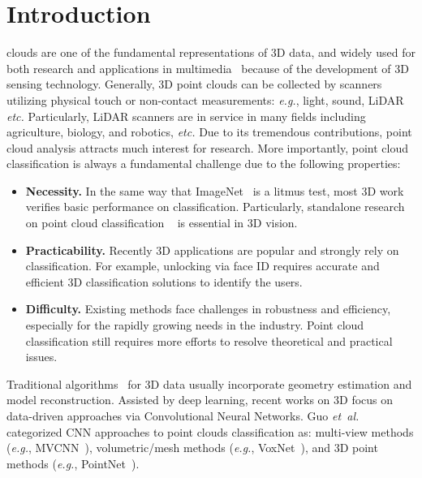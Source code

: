 \documentclass[journal,twoside]{IEEEtran}
\newcommand{\latinphrase}[1]{\textit{#1}}
\newcommand{\etal}{\latinphrase{et~al.}\xspace}
\newcommand{\eg}{\latinphrase{e.g.}\xspace}
\newcommand{\etc}{\latinphrase{etc.}\xspace}
\begin{document}
\section{Introduction}
\label{sec:intro}
 clouds are one of the fundamental representations of 3D data, and widely used for both research and applications in multimedia~\cite{chen2013point, wu2016fast, de2018graph, valsesia2020learning, zhang2020pointhop} because of the development of 3D sensing technology. Generally, 3D point clouds can be collected by scanners~\cite{blais2004review} utilizing physical touch or non-contact measurements: \eg, light, sound, LiDAR \etc Particularly, LiDAR scanners \cite{jaboyedoff2012use} are in service in many fields including agriculture, biology, and robotics, \etc Due to its tremendous contributions, point cloud analysis attracts much interest for research. More importantly, point cloud classification is always a fundamental challenge due to the following properties:
\begin{itemize}
\item \textbf{Necessity.}   In the same way that ImageNet~\cite{deng2009imagenet} is a litmus test, most 3D work verifies basic performance on classification. Particularly, standalone research on point cloud classification ~\cite{yang2018foldingnet,roveri2018network,chen2018sampled,Uy_2019_ICCV, Li_2020_CVPR, Nezhadarya_2020_CVPR} is essential in 3D vision.
\item  \textbf{Practicability.}  Recently 3D applications are popular and strongly rely on classification. For example, unlocking via face ID requires accurate and efficient 3D classification solutions to identify the users.
\item  \textbf{Difficulty.}  Existing methods face challenges in robustness and efficiency, especially for the rapidly growing needs in the industry. Point cloud classification still requires more efforts to resolve theoretical and practical issues.
\end{itemize}

Traditional algorithms~\cite{schnabel2007efficient,mitra2004registration,rusu2009fast,vosselman20013d} for 3D data usually incorporate geometry estimation and model reconstruction. Assisted by deep learning, recent works on 3D focus on data-driven approaches via Convolutional Neural Networks. Guo \etal~\cite{guo2019deep} categorized CNN approaches to point clouds classification as: multi-view methods (\eg, MVCNN~\cite{su2015multi}), volumetric/mesh methods (\eg, VoxNet~\cite{maturana2015voxnet}), and 3D point methods (\eg, PointNet~\cite{qi2017pointnet}).
\end{document}
